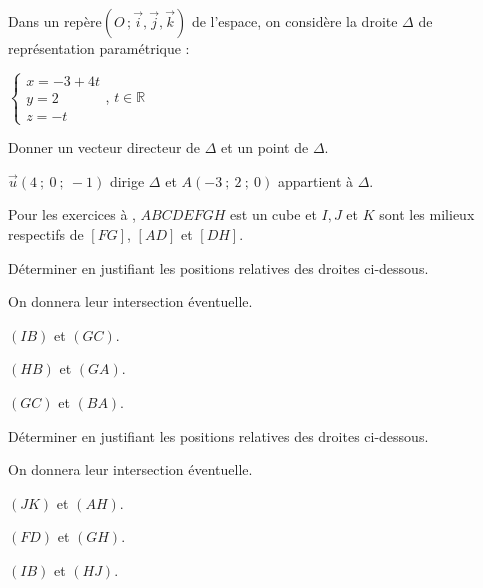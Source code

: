 \begin{colonne*exercice}
\pagebreak

\begin{exercice*}
  Dans un repère$(O\,;\vec{i},\vec{j},\vec{k})$ de l'espace, on considère
  la droite $\Delta$ de représentation paramétrique :

\begin{center}
  $\begin{cases}x=-3+4t \\y=2 \\z=-t \end{cases}$, $t\in\mathbb{R}$
\end{center}
Donner un vecteur directeur de $\Delta$ et un point de $\Delta$.
\end{exercice*}
\begin{corrige}
  $\overrightarrow{u}(4\ ;\ 0\ ;\ -1)$ dirige $\Delta$ et
  $A(-3\ ;\ 2\ ;\ 0)$ appartient à $\Delta$.
 \end{corrige}


Pour les exercices  à ,
$ABCDEFGH$ est un cube et $I, J$ et $K$ sont les milieux respectifs de
$[FG]$, $[AD]$ et $[DH]$.

\begin{center}
  
\end{center}

\begin{exercice}\label{G2Exo12}
  Déterminer en justifiant les positions relatives des droites
  ci-dessous. 

  On donnera leur intersection éventuelle.
  \begin{colenumerate}{2}
  \item $(IB)$ et $(GC)$.
  \item $(HB)$ et $(GA)$.
  \item $(GC)$ et $(BA)$.
  \end{colenumerate}
\end{exercice}

\begin{exercice}
  Déterminer en justifiant les positions relatives des droites
  ci-dessous. 

  On donnera leur intersection éventuelle.
  \begin{colenumerate}{2}
  \item $(JK)$ et $(AH)$.
  \item $(FD)$ et $(GH)$.
  \item $(IB)$ et $(HJ)$.
  \end{colenumerate}
\end{exercice}


\end{colonne*exercice}
